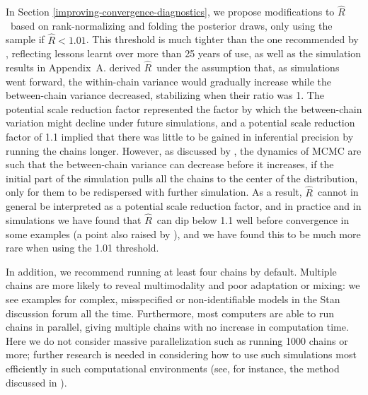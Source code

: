 \documentclass[american,]{article}
\newcommand{\Rhat}{$\widehat{R}$}
\theoremstyle{definition}
\begin{document}
In Section \ref{improving-convergence-diagnostics}, we propose modifications to  
\Rhat\ based on rank-normalizing and folding the posterior draws, only using the sample if  $\widehat{R} < 1.01$. 
This threshold is much tighter than the one recommended by 
\citet{Gelman+Rubin:1992}, reflecting lessons learnt over more than 25 years of use, as well as
the simulation results in Appendix~A.  \citet{Gelman+Rubin:1992}
derived \Rhat\ under the assumption that, as simulations went forward,
the within-chain variance would gradually increase while the
between-chain variance decreased, stabilizing when their ratio was 1.
The potential scale reduction factor represented the factor by which
the between-chain variation might decline under future simulations,
and a potential scale reduction factor of 1.1 implied that there was
little to be gained in inferential precision by running the chains
longer.  However, as discussed by \citet{Brooks+Gelman:1998}, the
dynamics of MCMC are such that the between-chain variance can decrease
before it increases, if the initial part of the simulation pulls all
the chains to the center of the distribution, only for them to be
redispersed with further simulation. As a result, \Rhat\ cannot in
general be interpreted as a potential scale reduction factor, and in
practice and in simulations we have found that \Rhat\ can dip below
1.1 well before convergence in some examples (a point also raised by
\citet{vats2018revisiting}), and we have found
this to be much more rare when using the 1.01 threshold.

In addition, we recommend running at least 
four chains by default.
Multiple chains are more likely to reveal multimodality and poor adaptation or mixing:  we see examples for complex,
misspecified or non-identifiable models in the Stan discussion forum all
the time. Furthermore, most computers are able to run chains in
parallel, giving multiple chains with no increase in computation time.
Here we do not consider massive parallelization such as running 1000
chains or more; further research is needed in considering how to use
such simulations most efficiently in such computational environments (see, for instance, the 
method discussed in \citet{jacob2017unbiased}).
\end{document}
